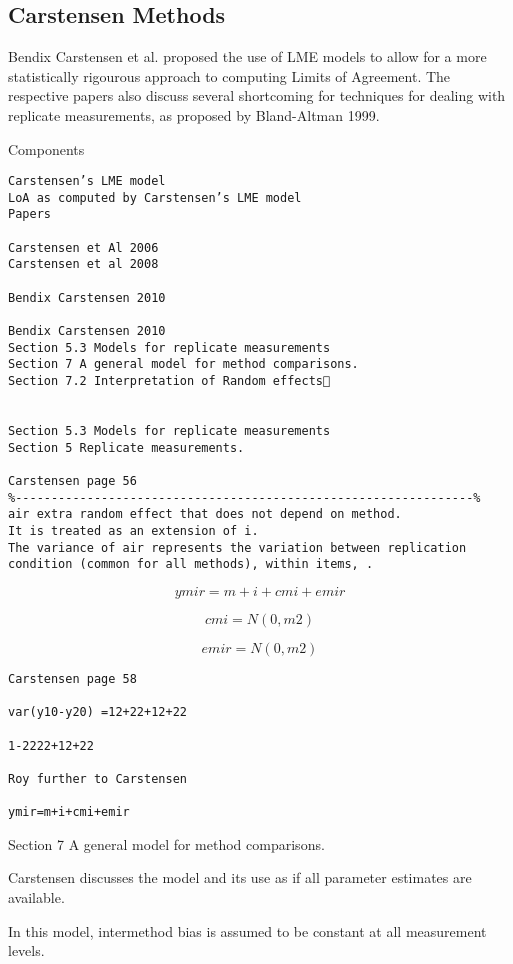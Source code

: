 \documentclass[Chap4bmain.tex]{subfiles}
\begin{document}
\subsection{Carstensen Methods}
Bendix Carstensen et al. proposed the use of LME models to allow for a more statistically rigourous approach to computing Limits of Agreement.  The respective papers also discuss several shortcoming for techniques for dealing with replicate measurements, as proposed by Bland-Altman 1999.

Components

\begin{verbatim}
Carstensen’s LME model
LoA as computed by Carstensen’s LME model
Papers

Carstensen et Al 2006
Carstensen et al 2008

Bendix Carstensen 2010

Bendix Carstensen 2010
Section 5.3 Models for replicate measurements
Section 7 A general model for method comparisons.
Section 7.2 Interpretation of Random effects


Section 5.3 Models for replicate measurements
Section 5 Replicate measurements.

Carstensen page 56
%----------------------------------------------------------------%
air extra random effect that does not depend on method.
It is treated as an extension of i.
The variance of air represents the variation between replication condition (common for all methods), within items, .
\end{verbatim}
\[ymir=m+i+cmi+emir\]

\[cmi=N(0,m2)\]

\[emir=N(0,m2)\]

\begin{verbatim}
Carstensen page 58

var(y10-y20) =12+22+12+22

1-2222+12+22

Roy further to Carstensen

ymir=m+i+cmi+emir

\end{verbatim}


Section 7 A general model for method comparisons.

Carstensen discusses the model and its use as if all parameter estimates are available.

In this model, intermethod bias is assumed to be constant at all measurement levels.
\end{document}
